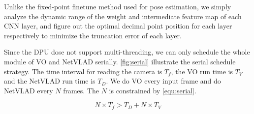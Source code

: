 
Unlike the fixed-point finetune method used for pose estimation, we simply analyze the dynamic range of the weight and intermediate feature map of each CNN layer, and figure out the optimal decimal point position for each layer respectively to minimize the truncation error of each layer. %




Since the DPU dose not support multi-threading, we can only schedule the whole module of VO and NetVLAD serially. \cref{fig:serial} illustrate the serial schedule strategy. The time interval for reading the camera is $T_{f}$, the VO run time is $T_{V}$ and the NetVLAD run time is $T_{D}$. We do VO every input frame and do NetVLAD every $N$ frames. The $N$ is constrained by \cref{equ:serial}.

\begin{equation}
    N \times T_{f} > T_{D} + N \times T_{V}
    \label{equ:serial}
\end{equation}



